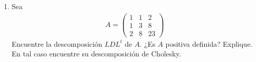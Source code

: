 \documentclass[11pt,letterpaper]{article}
\newcommand{\res}{\textbf{RESPUESTA}\\}
\newcommand{\fin}{$\blacksquare.$}
\newtheorem{thmt}{Teorema:}
\begin{document}
\begin{enumerate}
\res 
Ocupemos el siguiente teorema (demostrado en clase)
\begin{framed}
    \begin{thmt} \label{submatrices_LU}
    Sea $A$ una matriz no singular. $A$ tiene una factorización $LU$ si y solo si todas sus submatrices principales líderes son no singulares. 
    \end{thmt}
\end{framed} 
Una submatriz principal líder se obtiene cuando es principal y $I_c=I_r=\{ 1, 2 \cdots, k\}, k<n.$\\

 Entonces si observamos la matriz principal líder $
A_{2,2}=\begin{pmatrix}
1 & 2 \\
2 & 4
\end{pmatrix}$, podemos observar que es singular debido a que el renglón 2 es múltiplo del renglón 1 (o por que su determinante es cero). Por lo tanto (ocupando el teorema \ref{submatrices_LU}), como una matriz singular principal líder es singular, esto implica que $A$ no tiene factorización $LU$. \fin \\

\item Sea 
\begin{align*}
A=\begin{pmatrix}
1 & 1 & 2 \\
1 & 3 & 8\\
2 & 8 & 23
\end{pmatrix}
\end{align*}
Encuentre la descomposición $LDL^t$ de $A$. ¿Es $A$ positiva definida? Explique. En tal caso encuentre su descomposición de Cholesky.


\end{enumerate}
\end{document}
